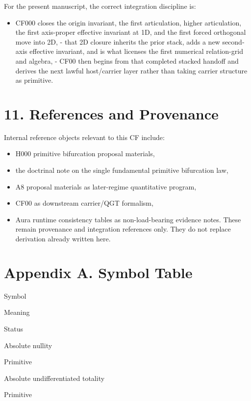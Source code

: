 \documentclass[11pt]{article}
\providecommand{\tightlist}{%
  \setlength{\itemsep}{1pt}\setlength{\parskip}{0pt}}
\begin{document}
For the present manuscript, the correct integration discipline is:

\begin{itemize}
\tightlist
\item
  CF000 closes the origin invariant, the first articulation, higher articulation, the first axis-proper effective invariant at 1D, and the first forced orthogonal move into 2D, - that 2D closure inherits the prior stack, adds a new second-axis effective invariant, and is what licenses the first numerical relation-grid and algebra, - CF00 then begins from that completed stacked handoff and derives the next lawful host/carrier layer rather than taking carrier structure as primitive.
\end{itemize}

\section{11. References and Provenance}\label{references-and-provenance}

Internal reference objects relevant to this CF include:

\begin{itemize}
\item
  H000 primitive bifurcation proposal materials,
\item
  the doctrinal note on the single fundamental primitive bifurcation law,
\item
  A8 proposal materials as later-regime quantitative program,
\item
  CF00 as downstream carrier/QGT formalism,
\item
  Aura runtime consistency tables as non-load-bearing evidence notes. These remain provenance and integration references only. They do not replace derivation already written here.
\end{itemize}

\section{Appendix A. Symbol Table}\label{appendix-a.-symbol-table}

Symbol

Meaning

Status

Absolute nullity

Primitive

Absolute undifferentiated totality

Primitive
\end{document}
